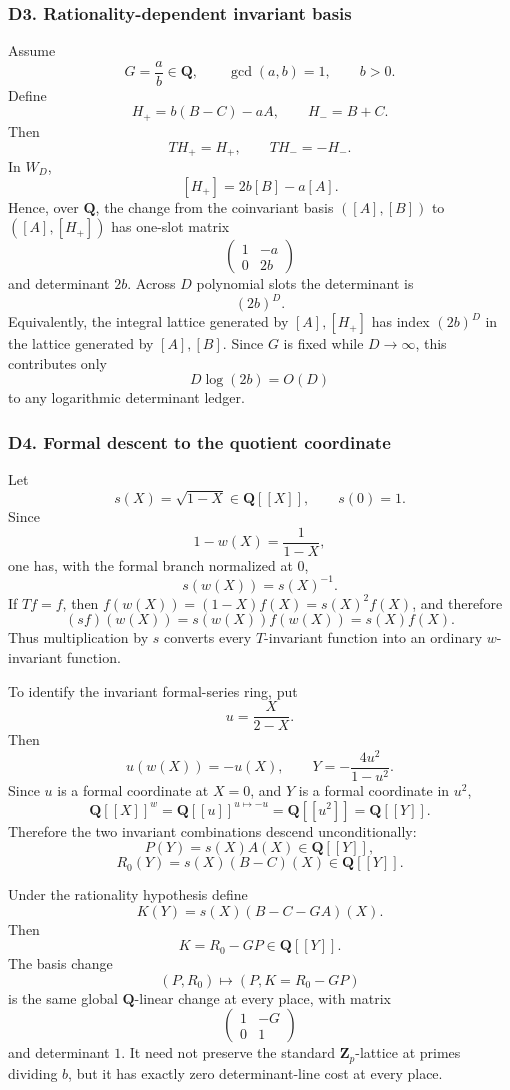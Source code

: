 \documentclass[
  10pt,
  letterpaper,
]{article}
\theoremstyle{definition}
\theoremstyle{remark}
\begin{document}
\subsubsection{D3. Rationality-dependent invariant
basis}\label{d3.-rationality-dependent-invariant-basis}

Assume \[
G=\frac ab\in\mathbf Q,
\qquad \gcd(a,b)=1,
\qquad b>0.
\] Define \[
H_+=b(B-C)-aA,
\qquad
H_-=B+C.
\] Then \[
TH_+=H_+,
\qquad
TH_-=-H_-.
\] In \(W_D\), \[
[H_+]=2b[B]-a[A].
\] Hence, over \(\mathbf Q\), the change from the coinvariant basis
\(([A],[B])\) to \(([A],[H_+])\) has one-slot matrix \[
\begin{pmatrix}
1&-a\\
0&2b
\end{pmatrix}
\] and determinant \(2b\). Across \(D\) polynomial slots the determinant
is \[
(2b)^D.
\] Equivalently, the integral lattice generated by \([A],[H_+]\) has
index \((2b)^D\) in the lattice generated by \([A],[B]\). Since \(G\) is
fixed while \(D\to\infty\), this contributes only \[
D\log(2b)=O(D)
\] to any logarithmic determinant ledger.

\subsubsection{D4. Formal descent to the quotient
coordinate}\label{d4.-formal-descent-to-the-quotient-coordinate}

Let \[
s(X)=\sqrt{1-X}\in\mathbf Q[[X]],
\qquad s(0)=1.
\] Since \[
1-w(X)=\frac1{1-X},
\] one has, with the formal branch normalized at \(0\), \[
s(w(X))=s(X)^{-1}.
\] If \(Tf=f\), then \(f(w(X))=(1-X)f(X)=s(X)^2f(X)\), and therefore \[
(s f)(w(X))=s(w(X))f(w(X))=s(X)f(X).
\] Thus multiplication by \(s\) converts every \(T\)-invariant function
into an ordinary \(w\)-invariant function.

To identify the invariant formal-series ring, put \[
u=\frac{X}{2-X}.
\] Then \[
u(w(X))=-u(X),
\qquad
Y=-\frac{4u^2}{1-u^2}.
\] Since \(u\) is a formal coordinate at \(X=0\), and \(Y\) is a formal
coordinate in \(u^2\), \[
\mathbf Q[[X]]^w
=\mathbf Q[[u]]^{u\mapsto-u}
=\mathbf Q[[u^2]]
=\mathbf Q[[Y]].
\] Therefore the two invariant combinations descend unconditionally: \[
\boxed{
P(Y)=s(X)A(X)\in\mathbf Q[[Y]],
}
\] \[
\boxed{
R_0(Y)=s(X)(B-C)(X)\in\mathbf Q[[Y]].
}
\]

Under the rationality hypothesis define \[
K(Y)=s(X)(B-C-GA)(X).
\] Then \[
\boxed{K=R_0-GP\in\mathbf Q[[Y]].}
\] The basis change \[
(P,R_0)\longmapsto(P,K=R_0-GP)
\] is the same global \(\mathbf Q\)-linear change at every place, with
matrix \[
\begin{pmatrix}
1&-G\\
0&1
\end{pmatrix}
\] and determinant \(1\). It need not preserve the standard
\(\mathbf Z_p\)-lattice at primes dividing \(b\), but it has exactly
zero determinant-line cost at every place.
\end{document}

